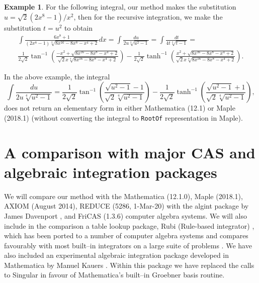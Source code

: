 \documentclass[12pt]{article}
\numberwithin{equation}{section}
\theoremstyle{definition}
\newtheorem{example}{Example}[section]
\begin{document}
\begin{example}
For the following integral, our method makes the substitution 
$u = \sqrt{2}\left(2x^8-1\right)/x^2$, then for the recursive integration, we make 
the substitution $t = u^2$ to obtain 
\begin{multline*}
\int \frac{6 x^8+1}{\left(2 x^8-1\right) \sqrt[4]{8 x^{16}-8 x^8-x^4+2}} dx =
 \int\frac{du}{2 u \sqrt[4]{u^2-1}} = \int \frac{dt}{4 t \sqrt[4]{t-1}} = \\
\frac{1}{2 \sqrt{2}} \tan ^{-1}\left(\frac{-x^2+\sqrt{8 x^{16}-8 x^8-x^4+2}}{\sqrt{2} x \sqrt[4]{8 x^{16}-8x^8-x^4+2}}\right) - 
\frac{1}{2 \sqrt{2}} \tanh ^{-1}\left(\frac{x^2+\sqrt{8 x^{16}-8x^8-x^4+2}}{\sqrt{2} x \sqrt[4]{8 x^{16}-8 x^8-x^4+2}}\right).
\end{multline*}
\end{example}

In the above example, the integral 
$$\int\frac{du}{2 u \sqrt[4]{u^2-1}} = 
\frac{1}{2\sqrt{2}} \tan ^{-1}\left(\frac{\sqrt{u^2-1}-1}{\sqrt{2} \sqrt[4]{u^2-1}}\right) - 
\frac{1}{2\sqrt{2}} \tanh ^{-1}\left(\frac{\sqrt{u^2-1}+1}{\sqrt{2} \sqrt[4]{u^2-1}}\right),$$ 
does not return an elementary form in either Mathematica (12.1) or Maple (2018.1) (without 
converting the integral to \texttt{RootOf} representation in Maple).
\fi

\section{A comparison with major CAS and algebraic integration packages}

We will compare our method with the Mathematica (12.1.0), Maple (2018.1), AXIOM (August 2014), 
REDUCE (5286, 1-Mar-20) with the algint package by James Davenport \cite{Davenport1979}, and 
FriCAS (1.3.6) computer algebra systems. We will also include 
in the comparison a table lookup package, Rubi (Rule-based integrator) \cite{Rich2018}, which 
has been ported to a number of computer algebra systems and compares favourably with most 
built--in integrators on a large suite of problems \cite{rubi_results}. We have also included 
an experimental algebraic integration package developed in Mathematica by Manuel Kauers 
\cite{Kauers2008}. Within this package we have replaced the calls to Singular in favour
of Mathematica's built--in Groebner basis routine.\\
\end{document}
